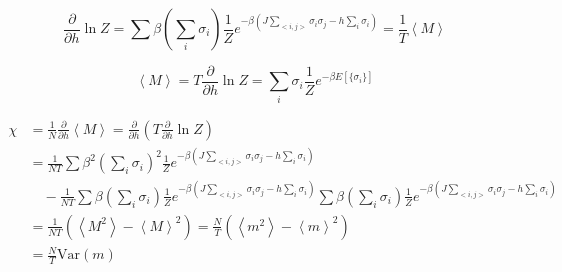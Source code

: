 \documentclass[fleqn]{article}
\begin{document}
\begin{equation}
\frac{\partial}{\partial h} \ln Z = \sum \beta \left( \sum_{i} \sigma_i \right) \frac{1}{Z} e^{-\beta (J \sum_{<i,j>} \sigma_i \sigma_j -h  \sum_{i} \sigma_i)} = \frac{1}{T} \left<M \right>
\end{equation}

\begin{equation}
\left<M\right>=T\frac{\partial}{\partial h}\ln Z=\sum_{i}\sigma_i \frac{1}{Z} e^{-\beta E[\{\sigma_i\}]}
\end{equation}

\begin{align}
\chi &= \frac{1}{N} \frac{\partial}{\partial h} \left<M \right> = \frac{\partial}{\partial h} \left( T \frac{\partial}{\partial h} \ln Z \right) \nonumber\\
    &= \frac{1}{NT} \sum \beta^2 \left( \sum_{i} \sigma_i \right)^2 \frac{1}{Z} e^{-\beta (J \sum_{<i,j>} \sigma_i \sigma_j -h \sum_{i} \sigma_i)} \nonumber\\
    &\quad - \frac{1}{NT} \sum \beta \left( \sum_{i} \sigma_i \right) \frac{1}{Z} e^{-\beta (J \sum_{<i,j>} \sigma_i \sigma_j -h \sum_{i} \sigma_i)}  \sum \beta \left( \sum_{i} \sigma_i \right) \frac{1}{Z} e^{-\beta (J \sum_{<i,j>} \sigma_i \sigma_j -h \sum_{i} \sigma_i)} \nonumber\\
    &= \frac{1}{NT} \left( \left< M^2 \right> - \left< M \right>^2 \right) = \frac{N}{T} \left( \left< m^2 \right> - \left< m \right>^2 \right) \nonumber\\
    &= \frac{N}{T} \text{Var}(m)
\end{align}
\end{document}

